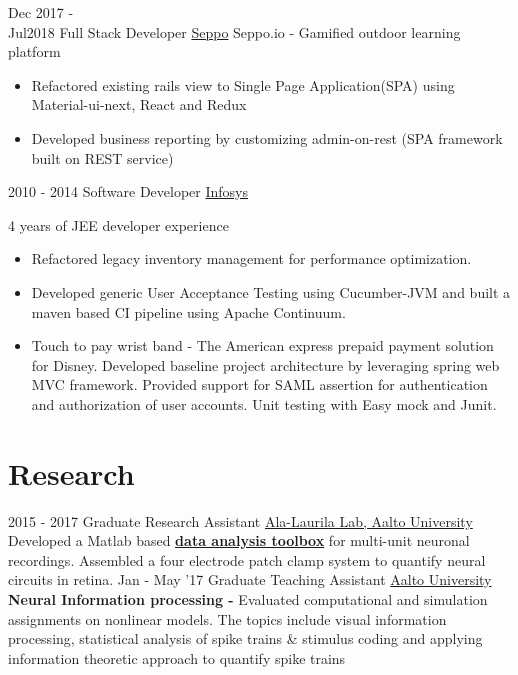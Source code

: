 \documentclass[letterpaper]{twentysecondcv} %
\begin{document}
\begin{twenty} %

	\twentyitem
	{Dec 2017 - \\Jul2018}
	{Full Stack Developer}
	{\href{http://www.seppo.io/}{Seppo}}
	{Seppo.io - Gamified outdoor learning platform}
	{
		\begin{itemize}
			\item Refactored existing rails view to Single Page Application(SPA) using Material-ui-next, React and Redux
			\item Developed business reporting by customizing admin-on-rest (SPA framework built on REST service)
		\end{itemize}
	}

	\twentyitem
	{2010 - 2014}
	{Software Developer}
	{\href{http://www.infosys.com/}{Infosys}}
	{}
	{4 years of JEE developer experience \\
		\begin{itemize}
			\item  Refactored legacy inventory management for performance optimization.
			\item Developed generic User Acceptance Testing using Cucumber-JVM and built a maven based CI pipeline using Apache Continuum.
			\item Touch to pay wrist band - The American express prepaid payment solution for Disney. Developed baseline project architecture by leveraging spring web MVC framework.
			      Provided support for SAML assertion for authentication and authorization of user accounts. Unit testing with Easy mock and Junit.
		\end{itemize}
	}

\end{twenty}


\section{Research}
\begin{twenty}
	\twentyitem
	{2015 - 2017}
	{Graduate Research Assistant}
	{\href{http://ala-laurila.biosci.helsinki.fi/}{Ala-Laurila Lab, Aalto University}}
	{}
	{
		{\\Developed a Matlab based \href{https://github.com/Schwartz-AlaLaurila-Labs/sa-labs-analysis}{\textbf{data analysis toolbox}} for multi-unit neuronal recordings. Assembled a four electrode patch clamp system to quantify neural circuits in retina.}
	}
	\twentyitem
	{Jan - May '17}
	{Graduate Teaching Assistant}
	{\href{http://www.aalto.fi}{Aalto University}}
	{}
	{
		{\\\textbf{Neural Information processing - }Evaluated computational and simulation assignments on  nonlinear models. The topics include visual information processing, statistical analysis of spike trains \& stimulus coding and applying information theoretic approach to quantify spike trains
			}
	}
\end{twenty}
\end{document}
